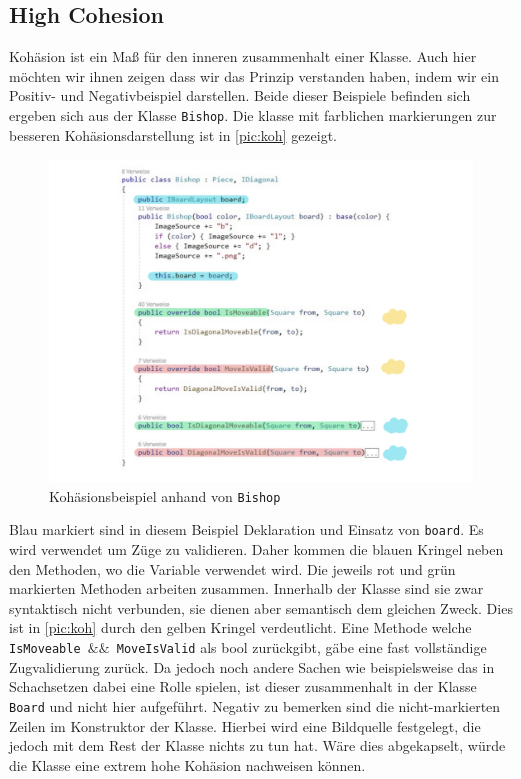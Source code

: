 \documentclass[
10pt, %
a4paper, %
oneside, %
headinclude,footinclude, %
BCOR5mm, %
]{scrartcl}
\begin{document}
\begin{onehalfspace}
\subsection{High Cohesion}
Kohäsion ist ein Maß für den inneren zusammenhalt einer Klasse. Auch hier möchten wir ihnen zeigen dass wir das Prinzip verstanden haben, indem wir ein Positiv- und Negativbeispiel darstellen. Beide dieser Beispiele befinden sich ergeben sich aus der Klasse \texttt{Bishop}. Die klasse mit farblichen markierungen zur besseren Kohäsionsdarstellung ist in \autoref{pic:koh} gezeigt.

\begin{figure}[h]
	\begin{center}
		\includegraphics[width=\textwidth]{Kohaesion.pdf}
		\caption{\label{pic:koh} Kohäsionsbeispiel anhand von \texttt{Bishop}}
	\end{center}
\end{figure}

Blau markiert sind in diesem Beispiel Deklaration und Einsatz von \texttt{board}. Es wird verwendet um Züge zu validieren. Daher kommen die blauen Kringel neben den Methoden, wo die Variable verwendet wird. Die jeweils rot und grün markierten Methoden arbeiten zusammen. Innerhalb der Klasse sind sie zwar syntaktisch nicht verbunden, sie dienen aber semantisch dem gleichen Zweck. Dies ist in \autoref{pic:koh} durch den gelben Kringel verdeutlicht. Eine Methode welche \texttt{IsMoveable $\&\&$ MoveIsValid} als bool zurückgibt, gäbe eine fast vollständige Zugvalidierung zurück. Da jedoch noch andere Sachen wie beispielsweise das in Schachsetzen dabei eine Rolle spielen, ist dieser zusammenhalt in der Klasse \texttt{Board} und nicht hier aufgeführt. 
Negativ zu bemerken sind die nicht-markierten Zeilen im Konstruktor der Klasse. Hierbei wird eine Bildquelle festgelegt, die jedoch mit dem Rest der Klasse nichts zu tun hat. Wäre dies abgekapselt, würde die Klasse eine extrem hohe Kohäsion nachweisen können.





\end{onehalfspace}
\end{document}
